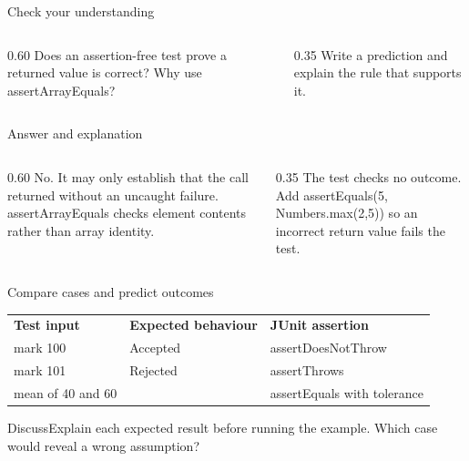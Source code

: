 \documentclass[10pt,aspectratio=169]{beamer}
\begin{document}
\begin{frame}[fragile,t]{Check your understanding}
\begin{columns}[T,onlytextwidth]\begin{column}{0.60\textwidth}
Does an assertion-free test prove a returned value is correct? Why use assertArrayEquals?
\end{column}\begin{column}{0.35\textwidth}\small
Write a prediction and explain the rule that supports it.
\end{column}\end{columns}
\end{frame}

\begin{frame}[fragile,t]{Answer and explanation}
\begin{columns}[T,onlytextwidth]\begin{column}{0.60\textwidth}
No. It may only establish that the call returned without an uncaught failure. assertArrayEquals checks element contents rather than array identity.
\end{column}\begin{column}{0.35\textwidth}\small
The test checks no outcome. Add assertEquals(5, Numbers.max(2,5)) so an incorrect return value fails the test.
\end{column}\end{columns}
\end{frame}


\begin{frame}[fragile,t]{Compare cases and predict outcomes}
\small\renewcommand{\arraystretch}{1.5}
\begin{tabularx}{\textwidth}{>{\raggedright\arraybackslash}X>{\raggedright\arraybackslash}X>{\raggedright\arraybackslash}X}\rowcolor{navy}
\color{white}\bfseries Test input & \color{white}\bfseries Expected behaviour & \color{white}\bfseries JUnit assertion\\
mark 100 & Accepted & assertDoesNotThrow\\
mark 101 & Rejected & assertThrows\\
mean of 40 and 60 & 50.0 & assertEquals with tolerance\\
\end{tabularx}\par\vspace{3mm}\begin{exampleblock}{Discuss}Explain each expected result before running the example. Which case would reveal a wrong assumption?\end{exampleblock}
\end{frame}
\end{document}
